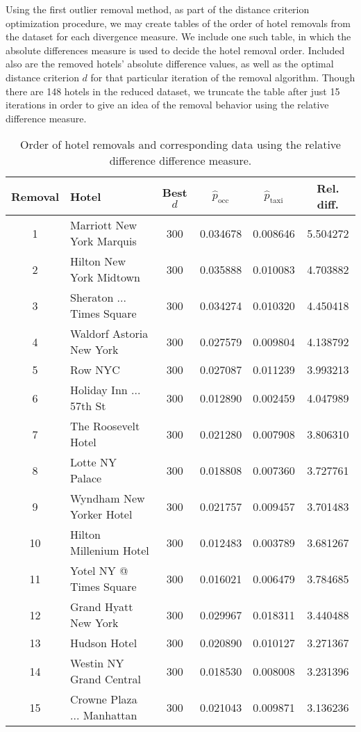 \documentclass[useAMS, referee, usenatbib]{biom}
\begin{document}
Using the first outlier removal method, as part of the distance criterion optimization procedure, we may create tables of the order of hotel removals from the dataset for each divergence measure. We include one such table, in which the absolute differences measure is used to decide the hotel removal order. Included also are the removed hotels' absolute difference values, as well as the optimal distance criterion $d$ for that particular iteration of the removal algorithm. Though there are 148 hotels in the reduced dataset, we truncate the table after just 15 iterations in order to give an idea of the removal behavior using the relative difference measure.

\begin{table}
\caption{Order of hotel removals and corresponding data using the relative difference difference measure.}
\label{t:relative_difference}
\begin{center}
\resizebox{\columnwidth}{!}
{
 \begin{tabular}{||c|l|c|c|c|c||}
 \hline
 Removal & Hotel & Best $d$ & $\hat{p}_{\mathrm{occ}}$ & $\hat{p}_{\mathrm{taxi}}$ & Rel. diff. \\ [0.5ex] 
 \hline
1   & Marriott New York Marquis & 300 & 0.034678 & 0.008646 & 5.504272 \\
2   & Hilton New York Midtown & 300 & 0.035888 & 0.010083 & 4.703882 \\
3   & Sheraton ... Times Square & 300 & 0.034274 & 0.010320 & 4.450418 \\
4   & Waldorf Astoria New York & 300 & 0.027579 & 0.009804 & 4.138792 \\
5   & Row NYC & 300 & 0.027087 & 0.011239 & 3.993213 \\
6   & Holiday Inn ... 57th St & 300 & 0.012890 & 0.002459 & 4.047989 \\
7   & The Roosevelt Hotel & 300 & 0.021280 & 0.007908 & 3.806310 \\
8   & Lotte NY Palace & 300 & 0.018808 & 0.007360 & 3.727761 \\
9   & Wyndham New Yorker Hotel & 300 & 0.021757 & 0.009457 & 3.701483 \\
10  & Hilton Millenium Hotel & 300 & 0.012483 & 0.003789 & 3.681267 \\
11  & Yotel NY @ Times Square & 300 & 0.016021 & 0.006479 & 3.784685 \\
12  & Grand Hyatt New York & 300 & 0.029967 & 0.018311 & 3.440488 \\
13  & Hudson Hotel & 300 & 0.020890 & 0.010127 & 3.271367 \\
14  & Westin NY Grand Central & 300 & 0.018530 & 0.008008 & 3.231396 \\
15  & Crowne Plaza ... Manhattan & 300 & 0.021043 & 0.009871 & 3.136236 \\

 \hline
\end{tabular}
}
\end{center}
\end{table}
\end{document}
